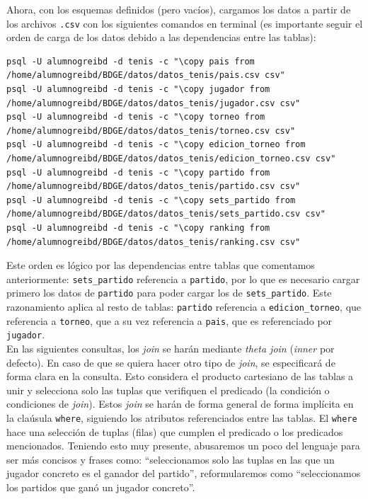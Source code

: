 \documentclass[11pt]{opticajnl}
\begin{document}
Ahora, con los esquemas definidos (pero vacíos), cargamos los datos a partir de los archivos \texttt{.csv} con los siguientes comandos en terminal (es importante seguir el orden de carga de los datos debido a las dependencias entre las tablas):

\begin{lstlisting}[style=terminal]
psql -U alumnogreibd -d tenis -c "\copy pais from /home/alumnogreibd/BDGE/datos/datos_tenis/pais.csv csv"
psql -U alumnogreibd -d tenis -c "\copy jugador from /home/alumnogreibd/BDGE/datos/datos_tenis/jugador.csv csv"
psql -U alumnogreibd -d tenis -c "\copy torneo from /home/alumnogreibd/BDGE/datos/datos_tenis/torneo.csv csv"
psql -U alumnogreibd -d tenis -c "\copy edicion_torneo from /home/alumnogreibd/BDGE/datos/datos_tenis/edicion_torneo.csv csv"
psql -U alumnogreibd -d tenis -c "\copy partido from /home/alumnogreibd/BDGE/datos/datos_tenis/partido.csv csv"
psql -U alumnogreibd -d tenis -c "\copy sets_partido from /home/alumnogreibd/BDGE/datos/datos_tenis/sets_partido.csv csv"
psql -U alumnogreibd -d tenis -c "\copy ranking from /home/alumnogreibd/BDGE/datos/datos_tenis/ranking.csv csv"
\end{lstlisting}

Este orden es lógico por las dependencias entre tablas que comentamos anteriormente: \texttt{sets\_partido} referencia a \texttt{partido}, por lo que es necesario cargar primero los datos de \texttt{partido} para poder cargar los de \texttt{sets\_partido}. Este razonamiento aplica al resto de tablas: \texttt{partido} referencia a \texttt{edicion\_torneo}, que referencia a \texttt{torneo}, que a su vez referencia a \texttt{pais}, que es referenciado por \texttt{jugador}. \\

En las siguientes consultas, los \textit{join} se harán mediante \textit{theta join} (\textit{inner} por defecto). En caso de que se quiera hacer otro tipo de \textit{join}, se especificará de forma clara en la consulta. Esto considera el producto cartesiano de las tablas a unir y selecciona solo las tuplas que verifiquen el predicado (la condición o condiciones de \textit{join}). Estos \textit{join} se harán de forma general de forma implícita en la claúsula \texttt{where}, siguiendo los atributos referenciados entre las tablas. El \texttt{where} hace una selección de tuplas (filas) que cumplen el predicado o los predicados mencionados. Teniendo esto muy presente, abusaremos un poco del lenguaje para ser más concisos y frases como: ``seleccionamos solo las tuplas en las que un jugador concreto es el ganador del partido'', reformularemos como ``seleccionamos los partidos que ganó un jugador concreto''. \\
\end{document}
